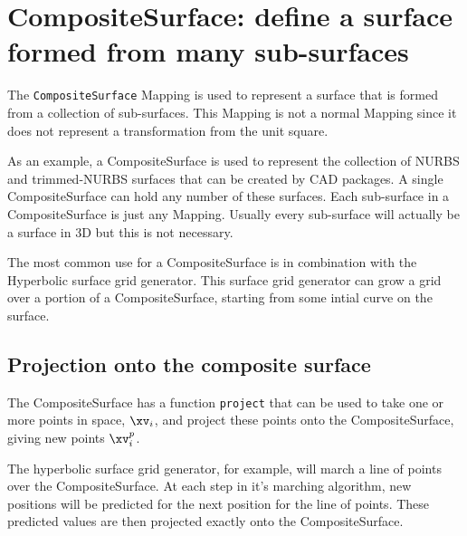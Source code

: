 \section{CompositeSurface: define a surface formed from many sub-surfaces}

The {\tt CompositeSurface} Mapping is used to represent a surface that
is formed from a collection of sub-surfaces. This Mapping is not a
normal Mapping since it does not represent a transformation from the
unit square. 

As an example, a CompositeSurface is used to represent the collection of
NURBS and trimmed-NURBS surfaces that can be created by CAD packages. A single
CompositeSurface can hold any number of these surfaces. Each sub-surface
in a CompositeSurface is just any Mapping. Usually every sub-surface
will actually be a surface in 3D but this is not necessary.


The most common use for a CompositeSurface is in combination with
the Hyperbolic surface grid generator. This surface grid generator
can grow a grid over a portion of a CompositeSurface, starting from
some intial curve on the surface. 



\subsection{Projection onto the composite surface}

  The CompositeSurface has a function {\tt project} that can be used 
to take one or more points in space, $\xv_i$, and project these points
onto the CompositeSurface, giving new points $\xv_i^p$. 

The hyperbolic surface grid generator, for example, will march a line
of points over the CompositeSurface. At each step in it's marching algorithm,
new positions will be predicted for the next position for the line of points.
These predicted values are then projected exactly onto the CompositeSurface.

